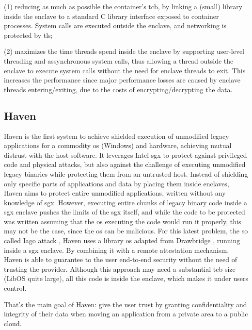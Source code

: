 (1) reducing as much as possible the container's \gls{tcb}, by linking a (small) library inside the enclave to a standard C library interface exposed to container processes. System calls are executed outside the enclave, and networking is protected by \gls{tls};

(2) maximizes the time threads spend inside the enclave by supporting user-level threading and assynchronous system calls, thus allowing a thread outside the enclave to execute system calls without the need for enclave threads to exit.
This increases the performance since major performance losses are caused by enclave threads entering/exiting, due to the costs of encrypting/decrypting the data.



\subsection{Haven}
\label{ssec:haven}

Haven is the first system to achieve shielded execution of unmodified legacy applications for a commodity \gls{os} (Windows) and hardware, achieving mutual distrust with the host software.
It leverages Intel-\gls{sgx} to protect against privileged code and physical attacks, but also against the challenge of executing unmodified legacy binaries while protecting them from an untrusted host.
Instead of shielding only specific parts of applications and data by placing them inside enclaves, Haven aims to protect entire unmodified applications, written without any knowledge of \gls{sgx}. 
However, executing entire chunks of legacy binary code inside a \gls{sgx} enclave pushes the limits of the \gls{sgx} itself, and while the code to be protected was written assuming that the \gls{os} executing the code would run it properly, this may not be the case, since the \gls{os} can be malicious. For this latest problem, the so called Iago attack \cite{iagoAttacks}, Haven uses a library \gls{os} adapted from Drawbridge \cite{drawbridge}, running inside a \gls{sgx} enclave. 
By combining it with a remote attestation mechanism, Haven is able to guarantee to the user end-to-end security without the need of trusting the provider.
Although this approach may need a substantial \gls{tcb} size (LibOS quite large), all this code is inside the enclave, which makes it under users control. 

That's the main goal of Haven: give the user trust by granting confidentiality and integrity of their data when moving an application from a private area to a public cloud. 


